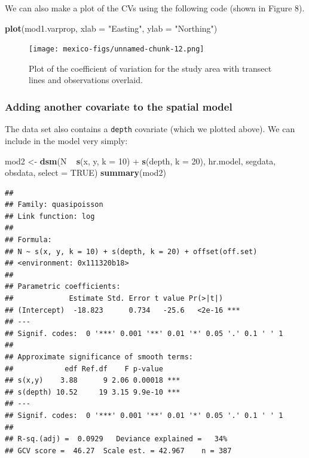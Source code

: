 \documentclass[]{amsart}
\newenvironment{Shaded}{}{}
\newcommand{\KeywordTok}[1]{\textcolor[rgb]{0.00,0.44,0.13}{\textbf{{#1}}}}
\newcommand{\DataTypeTok}[1]{\textcolor[rgb]{0.56,0.13,0.00}{{#1}}}
\newcommand{\DecValTok}[1]{\textcolor[rgb]{0.25,0.63,0.44}{{#1}}}
\newcommand{\StringTok}[1]{\textcolor[rgb]{0.25,0.44,0.63}{{#1}}}
\newcommand{\OtherTok}[1]{\textcolor[rgb]{0.00,0.44,0.13}{{#1}}}
\newcommand{\NormalTok}[1]{{#1}}
\begin{document}
We can also make a plot of the CVs using the following code (shown in
Figure 8).

\begin{Shaded}
\begin{Highlighting}[]
\KeywordTok{plot}\NormalTok{(mod1.varprop, }\DataTypeTok{xlab =} \StringTok{"Easting"}\NormalTok{, }\DataTypeTok{ylab =} \StringTok{"Northing"}\NormalTok{)}
\end{Highlighting}
\end{Shaded}

\begin{figure}[htbp]
\centering
\texttt{[image: mexico-figs/unnamed-chunk-12.png]}
\caption{Plot of the coefficient of variation for the study area with
transect lines and observations overlaid.}
\end{figure}

\subsubsection{Adding another covariate to the spatial model}

The data set also contains a \texttt{depth} covariate (which we plotted
above). We can include in the model very simply:

\begin{Shaded}
\begin{Highlighting}[]
\NormalTok{mod2 <-}\StringTok{ }\KeywordTok{dsm}\NormalTok{(N ~}\StringTok{ }\KeywordTok{s}\NormalTok{(x, y, }\DataTypeTok{k =} \DecValTok{10}\NormalTok{) +}\StringTok{ }\KeywordTok{s}\NormalTok{(depth, }\DataTypeTok{k =} \DecValTok{20}\NormalTok{), hr.model, segdata, obsdata, }
    \DataTypeTok{select =} \OtherTok{TRUE}\NormalTok{)}
\KeywordTok{summary}\NormalTok{(mod2)}
\end{Highlighting}
\end{Shaded}

\begin{verbatim}
## 
## Family: quasipoisson 
## Link function: log 
## 
## Formula:
## N ~ s(x, y, k = 10) + s(depth, k = 20) + offset(off.set)
## <environment: 0x111320b18>
## 
## Parametric coefficients:
##             Estimate Std. Error t value Pr(>|t|)    
## (Intercept)  -18.823      0.734   -25.6   <2e-16 ***
## ---
## Signif. codes:  0 '***' 0.001 '**' 0.01 '*' 0.05 '.' 0.1 ' ' 1
## 
## Approximate significance of smooth terms:
##            edf Ref.df    F p-value    
## s(x,y)    3.88      9 2.06 0.00018 ***
## s(depth) 10.52     19 3.15 9.9e-10 ***
## ---
## Signif. codes:  0 '***' 0.001 '**' 0.01 '*' 0.05 '.' 0.1 ' ' 1
## 
## R-sq.(adj) =  0.0929   Deviance explained =   34%
## GCV score =  46.27  Scale est. = 42.967    n = 387
\end{verbatim}
\end{document}
